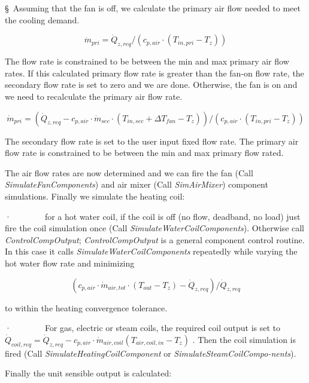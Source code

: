 §~Assuming that the fan is off, we calculate the primary air flow needed to meet the cooling demand.

\begin{equation}
{\dot m_{pri}} = {\dot Q_{z,req}}/({c_{p,air}}\cdot ({T_{in,pri}} - {T_z}))
\end{equation}

The flow rate is constrained to be between the min and max primary air flow rates. If this calculated primary flow rate is greater than the fan-on flow rate, the secondary flow rate is set to zero and we are done. Otherwise, the fan is on and we need to recalculate the primary air flow rate.

\begin{equation}
{\dot m_{pri}} = ({\dot Q_{z,req}} - {c_{p,air}}\cdot {\dot m_{sec}}\cdot ({T_{in,sec}} + \Delta {T_{fan}} - {T_z}))/({c_{p,air}}\cdot ({T_{in,pri}} - {T_z}))
\end{equation}

The secondary flow rate is set to the user input fixed flow rate. The primary air flow rate is constrained to be between the min and max primary flow rated.

The air flow rates are now determined and we can fire the fan (Call \emph{SimulateFanComponents}) and air mixer (Call \emph{SimAirMixer}) component simulations. Finally we simulate the heating coil:

·~~~~~~~~for a hot water coil, if the coil is off (no flow, deadband, no load) just fire the coil simulation once (Call \emph{SimulateWaterCoilComponents}). Otherwise call \emph{ControlCompOutput}; \emph{ControlCompOutput} is a general component control routine. In this case it calls \emph{SimulateWaterCoilComponents} repeatedly while varying the hot water flow rate and minimizing

\begin{equation}
({c_{p,air}}\cdot {\dot m_{air,tot}}\cdot ({T_{out}} - {T_z}) - {\dot Q_{z,req}})/{\dot Q_{z,req}}
\end{equation}

to within the heating convergence tolerance.

·~~~~~~~~For gas, electric or steam coils, the required coil output is set to \({\dot Q_{coil,req}} = {\dot Q_{z,req}} - {c_{p,air}}\cdot {\dot m_{air,coil}}({T_{air,coil,in}} - {T_z})\) . Then the coil simulation is fired (Call \emph{SimulateHeatingCoilComponent} or \emph{SimulateSteamCoilCompo-nents}).

Finally the unit sensible output is calculated:

